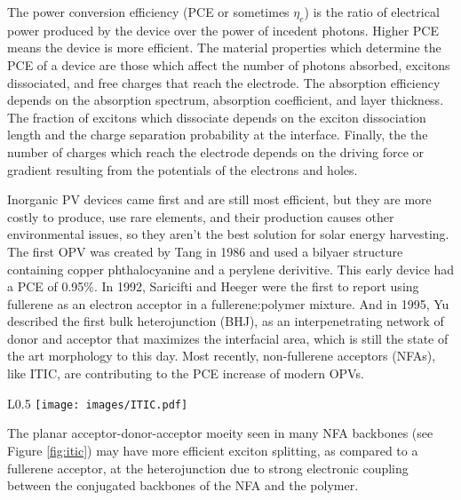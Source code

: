 The power conversion efficiency (PCE or sometimes $\eta_{e}$) is the ratio of electrical power produced by the device over the power of incedent photons.
Higher PCE means the device is more efficient.  
The material properties which determine the PCE of a device are those which affect the number of photons absorbed, excitons dissociated, and free charges that reach the electrode.
The absorption efficiency depends on the absorption spectrum, absorption coefficient, and layer thickness.
The fraction of excitons which dissociate depends on the exciton dissociation length and the charge separation probability at the interface.
Finally, the the number of charges which reach the electrode depends on the driving force or gradient resulting from the potentials of the electrons and holes\cite{Hoppe2004}.

Inorganic PV devices came first and are still most efficient, but they are more costly to produce, use rare elements, and their production causes other environmental issues, so they aren't the best solution for solar energy harvesting. 
The first OPV was created by Tang in 1986 and used a bilyaer structure containing copper phthalocyanine and a perylene derivitive\cite{Tang1986b}. 
This early device had a PCE of 0.95\%.
In 1992, Saricifti and Heeger were the first to report using fullerene as an electron acceptor in a fullerene:polymer mixture\cite{Sariciftci1992}.
And in 1995, Yu described the first bulk heterojunction (BHJ), as an interpenetrating network of donor and acceptor that maximizes the interfacial area, which is still the state of the art morphology to this day\cite{Yu1995}.
Most recently, non-fullerene acceptors (NFAs), like ITIC, are contributing to the PCE increase of modern OPVs\cite{S.Gurney2019b}.

\begin{wrapfigure}{L}{0.5\linewidth}
    \centering
    \texttt{[image: images/ITIC.pdf]}
    \caption{ITIC chemical structure with \textcolor{red}{electron accepting regions in red} and \textcolor{blue}{electron donating regions in blue}}
    \label{fig:itic}
\end{wrapfigure}

The planar acceptor-donor-acceptor moeity seen in many NFA backbones (see Figure \ref{fig:itic}) may have more efficient exciton splitting, as compared to a fullerene acceptor, at the heterojunction due to strong electronic coupling between the conjugated backbones of the NFA and the polymer\cite{Yi2018a}.

